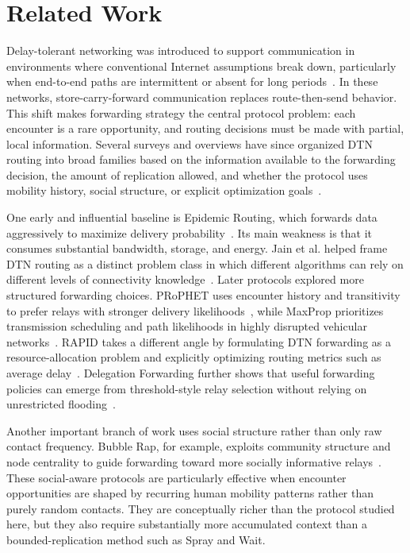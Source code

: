 \section{Related Work}

Delay-tolerant networking was introduced to support communication in environments where conventional Internet assumptions break down, particularly when end-to-end paths are intermittent or absent for long periods~\cite{fall2003dtn}. In these networks, store-carry-forward communication replaces route-then-send behavior. This shift makes forwarding strategy the central protocol problem: each encounter is a rare opportunity, and routing decisions must be made with partial, local information. Several surveys and overviews have since organized DTN routing into broad families based on the information available to the forwarding decision, the amount of replication allowed, and whether the protocol uses mobility history, social structure, or explicit optimization goals~\cite{zhang2006overview,sobin2016survey}.

One early and influential baseline is Epidemic Routing, which forwards data aggressively to maximize delivery probability~\cite{vahdat2000epidemic}. Its main weakness is that it consumes substantial bandwidth, storage, and energy. Jain et al. helped frame DTN routing as a distinct problem class in which different algorithms can rely on different levels of connectivity knowledge~\cite{jain2004routing}. Later protocols explored more structured forwarding choices. PRoPHET uses encounter history and transitivity to prefer relays with stronger delivery likelihoods~\cite{lindgren2012prophet}, while MaxProp prioritizes transmission scheduling and path likelihoods in highly disrupted vehicular networks~\cite{burgess2006maxprop}. RAPID takes a different angle by formulating DTN forwarding as a resource-allocation problem and explicitly optimizing routing metrics such as average delay~\cite{balasubramanian2007rapid}. Delegation Forwarding further shows that useful forwarding policies can emerge from threshold-style relay selection without relying on unrestricted flooding~\cite{erramilli2008delegation}.

Another important branch of work uses social structure rather than only raw contact frequency. Bubble Rap, for example, exploits community structure and node centrality to guide forwarding toward more socially informative relays~\cite{hui2011bubblerap}. These social-aware protocols are particularly effective when encounter opportunities are shaped by recurring human mobility patterns rather than purely random contacts. They are conceptually richer than the protocol studied here, but they also require substantially more accumulated context than a bounded-replication method such as Spray and Wait.

